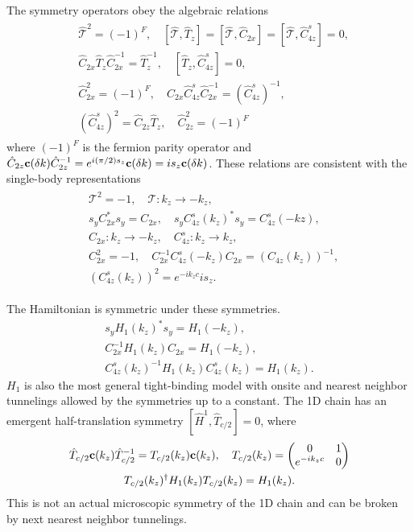 The symmetry operators obey the algebraic relations \begin{align}\begin{split}&\hat{\mathcal{T}}^2=(-1)^F,\quad[\hat{\mathcal{T}},\hat{T}_z]=[\hat{\mathcal{T}},\hat{C}_{2x}]=[\hat{\mathcal{T}},\hat{C}^s_{4z}]=0,\\&\hat{C}_{2x}\hat{T}_z\hat{C}_{2x}^{-1}=\hat{T}_z^{-1},\quad[\hat{T}_z,\hat{C}^s_{4z}]=0,\\&\hat{C}_{2x}^2=(-1)^F,\quad\hat{C}_{2x}\hat{C}^s_{4z}\hat{C}_{2x}^{-1}=\left(\hat{C}^s_{4z}\right)^{-1},\\&\left(\hat{C}^s_{4z}\right)^2=\hat{C}_{2z}\hat{T}_z,\quad\hat{C}_{2z}^2=(-1)^F\end{split}\end{align} where $(-1)^F$ is the fermion parity operator and $\hat{C}_{2z}{\bf c}(\delta k)\hat{C}_{2z}^{-1}=e^{i(\pi/2)s_z}{\bf c}(\delta k)=is_z{\bf c}(\delta k)$. These relations are consistent with the single-body representations \begin{align}
\begin{split}
&\mathcal{T}^2=-1,\quad\mathcal{T}:k_z\to-k_z,\\
& s_yC_{2x}^\ast s_y=C_{2x},\quad s_yC^s_{4z}(k_z)^\ast s_y=C^s_{4z}(-kz),\\
&C_{2x}:k_z\to-k_z,\quad C^s_{4z}:k_z\to k_z,\\
&C_{2x}^2=-1,\quad C_{2x}^{-1}C^s_{4z}(-k_z)C_{2x}=\left(C_{4z}(k_z)\right)^{-1},\\
&\left(C^s_{4z}(k_z)\right)^2=e^{-ik_zc}is_z.
\end{split}
\end{align} 

The Hamiltonian is symmetric under these symmetries. \begin{align}
s_yH_1(k_z)^\ast s_y=H_1(-k_z),\\
C_{2x}^{-1}H_1(k_z)C_{2x}=H_1(-k_z),\\
C^s_{4z}(k_z)^{-1}H_1(k_z)C^s_{4z}(k_z)=H_1(k_z).
\label{1dchainsymm1}
\end{align} 
$H_1$ is also the most general tight-binding model with onsite and nearest neighbor tunnelings allowed by the symmetries up to a constant. The 1D chain has an emergent half-translation symmetry $[\hat{H}^1,\hat{T}_{c/2}]=0$, where \begin{gather}\hat{T}_{c/2}{\bf c}(k_z)\hat{T}_{c/2}^{-1}=T_{c/2}(k_z){\bf c}(k_z),\quad T_{c/2}(k_z)=\begin{pmatrix}0&1\\e^{-ik_zc}&0\end{pmatrix}\label{halfTc}\\T_{c/2}(k_z)^\dagger H_1(k_z)T_{c/2}(k_z)=H_1(k_z).\nonumber\end{gather} This is not an actual microscopic symmetry of the 1D chain and can be broken by next nearest neighbor tunnelings. 

